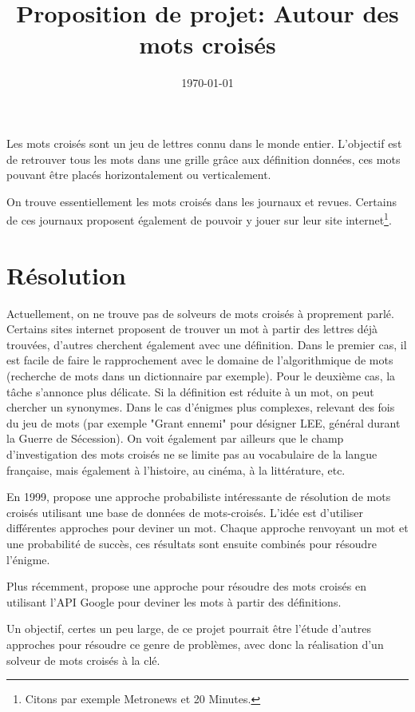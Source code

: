 \documentclass{article}
\title{Proposition de projet: Autour des mots croisés}
\author{}
\date{\today}
\begin{document}
\maketitle

Les mots croisés sont un jeu de lettres connu dans le monde entier. L'objectif est de retrouver tous les mots dans une grille grâce aux définition données, ces mots pouvant être placés horizontalement ou verticalement.

On trouve essentiellement les mots croisés dans les journaux et revues. Certains de ces journaux proposent également de pouvoir y jouer sur leur site internet\footnote{Citons par exemple Metronews et 20 Minutes.}.

\section{Résolution}

Actuellement, on ne trouve pas de solveurs de mots croisés à proprement parlé. Certains sites internet proposent de trouver un mot à partir des lettres déjà trouvées, d'autres cherchent également avec une définition. Dans le premier cas, il est facile de faire le rapprochement avec le domaine de l'algorithmique de mots (recherche de mots dans un dictionnaire par exemple). Pour le deuxième cas, la tâche s'annonce plus délicate. Si la définition est réduite à un mot, on peut chercher un synonymes. Dans le cas d'énigmes plus complexes, relevant des fois du jeu de mots (par exemple "Grant ennemi" pour désigner LEE, général durant la Guerre de Sécession). On voit également par ailleurs que le champ d'investigation des mots croisés ne se limite pas au vocabulaire de la langue française, mais également à l'histoire, au cinéma, à la littérature, etc.

En 1999, \cite{proverb} propose une approche probabiliste intéressante de résolution de mots croisés utilisant une base de données de mots-croisés. L'idée est d'utiliser différentes approches pour deviner un mot. Chaque approche renvoyant un mot et une probabilité de succès, ces résultats sont ensuite combinés pour résoudre l'énigme.

Plus récemment, \cite{GCV} propose une approche pour résoudre des mots croisés en utilisant l'API Google pour deviner les mots à partir des définitions.

Un objectif, certes un peu large, de ce projet pourrait être l'étude d'autres approches pour résoudre ce genre de problèmes, avec donc la réalisation d'un solveur de mots croisés à la clé.
\end{document}
